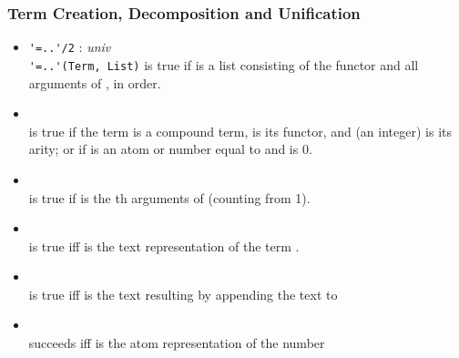 \subsubsection{Term Creation, Decomposition and Unification}
%
\begin{itemize}
%
\item \verb|'=..'/2| : \textit{univ}\\
\noindent\verb|'=..'(Term, List)| is true if  is a list
consisting of the functor and all arguments of , in
order. \\
%
\item {}\\
\noindent{} is true if the term
 is a compound term,  is its functor, and
 (an integer) is its arity; or if  is an atom
or number equal to  and  is 0.\\
%
\item {}\\
\noindent{} is true if  is the th
arguments of  (counting from 1).\\
%
\item {}\\
\noindent{} is true iff  is the
text representation of the term .\\
%
\item {}\\
\noindent{} is
true iff  is the text resulting by appending the text
 to \.\\
%
\item {}\\
\noindent{} succeeds iff 
is the atom representation of the number \\
\\
%
\end{itemize}

